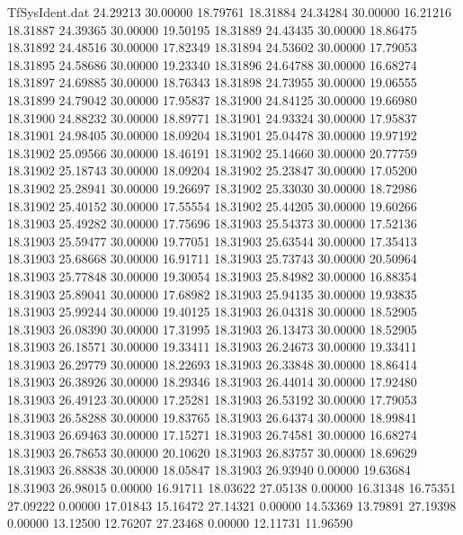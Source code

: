 \begin{filecontents}{TfSysIdent.dat}
  24.29213   30.00000   18.79761   18.31884
  24.34284   30.00000   16.21216   18.31887
  24.39365   30.00000   19.50195   18.31889
  24.43435   30.00000   18.86475   18.31892
  24.48516   30.00000   17.82349   18.31894
  24.53602   30.00000   17.79053   18.31895
  24.58686   30.00000   19.23340   18.31896
  24.64788   30.00000   16.68274   18.31897
  24.69885   30.00000   18.76343   18.31898
  24.73955   30.00000   19.06555   18.31899
  24.79042   30.00000   17.95837   18.31900
  24.84125   30.00000   19.66980   18.31900
  24.88232   30.00000   18.89771   18.31901
  24.93324   30.00000   17.95837   18.31901
  24.98405   30.00000   18.09204   18.31901
  25.04478   30.00000   19.97192   18.31902
  25.09566   30.00000   18.46191   18.31902
  25.14660   30.00000   20.77759   18.31902
  25.18743   30.00000   18.09204   18.31902
  25.23847   30.00000   17.05200   18.31902
  25.28941   30.00000   19.26697   18.31902
  25.33030   30.00000   18.72986   18.31902
  25.40152   30.00000   17.55554   18.31902
  25.44205   30.00000   19.60266   18.31903
  25.49282   30.00000   17.75696   18.31903
  25.54373   30.00000   17.52136   18.31903
  25.59477   30.00000   19.77051   18.31903
  25.63544   30.00000   17.35413   18.31903
  25.68668   30.00000   16.91711   18.31903
  25.73743   30.00000   20.50964   18.31903
  25.77848   30.00000   19.30054   18.31903
  25.84982   30.00000   16.88354   18.31903
  25.89041   30.00000   17.68982   18.31903
  25.94135   30.00000   19.93835   18.31903
  25.99244   30.00000   19.40125   18.31903
  26.04318   30.00000   18.52905   18.31903
  26.08390   30.00000   17.31995   18.31903
  26.13473   30.00000   18.52905   18.31903
  26.18571   30.00000   19.33411   18.31903
  26.24673   30.00000   19.33411   18.31903
  26.29779   30.00000   18.22693   18.31903
  26.33848   30.00000   18.86414   18.31903
  26.38926   30.00000   18.29346   18.31903
  26.44014   30.00000   17.92480   18.31903
  26.49123   30.00000   17.25281   18.31903
  26.53192   30.00000   17.79053   18.31903
  26.58288   30.00000   19.83765   18.31903
  26.64374   30.00000   18.99841   18.31903
  26.69463   30.00000   17.15271   18.31903
  26.74581   30.00000   16.68274   18.31903
  26.78653   30.00000   20.10620   18.31903
  26.83757   30.00000   18.69629   18.31903
  26.88838   30.00000   18.05847   18.31903
  26.93940    0.00000   19.63684   18.31903
  26.98015    0.00000   16.91711   18.03622
  27.05138    0.00000   16.31348   16.75351
  27.09222    0.00000   17.01843   15.16472
  27.14321    0.00000   14.53369   13.79891
  27.19398    0.00000   13.12500   12.76207
  27.23468    0.00000   12.11731   11.96590

\end{filecontents}
